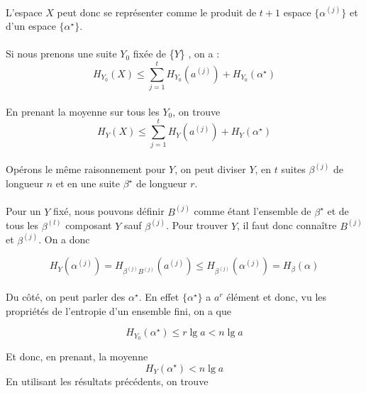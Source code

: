 	\paragraph{}
	L'espace ${X}$ peut donc se représenter comme le produit de $t+1$ 
	espace $\{\alpha^{(j)}\}$ et d'un espace 
	$\{\alpha^\star\}$.
	
	\paragraph{}
	Si nous prenons une suite $Y_0$ fixée de  \{$Y$\} , on a :
	\[
		H_{Y_0}(X)\le 
		\sum_{j=1}^tH_{Y_0}\left(a^{(j)}\right)+H_{Y_0}(\alpha^\star)
	\]
	
	\paragraph{}
	En prenant la moyenne sur tous les $Y_0$, on trouve
	\[H_Y(X)\le \sum_{j=1}^tH_Y\left(a^{(j)}\right)+H_Y(\alpha^\star)\]
	
	\paragraph{}
	Opérons le même raisonnement pour $Y$, on peut diviser $Y$, en $t$ 
	suites $\beta^{(j)}$ de longueur $n$ et en une suite ${\beta^\star}$
	de longueur $r$. 
	
	\paragraph{}
	Pour un $Y$ fixé, nous pouvons définir $B^{(j)}$ comme étant l'ensemble de
	$\beta^\star$ et de tous les $\beta^{(l)}$ composant $Y$ sauf 
	$\beta^{(j)}$. Pour trouver $Y$, il faut donc connaître $B^{(j)}$ 
	et $\beta^{(j)}$. On a 	donc
	
	\[
		H_Y(\alpha^{(j)}) = H_{\beta^{(j)}B^{(j)}}\left(a^{(j)}\right) \le 
		H_{\beta^{(j)}}\left(\alpha^{(j)}\right)=H_\beta(\alpha)
	\]
	
	\paragraph{}
	Du côté, on peut parler des $\alpha^\star$. En effet $\{\alpha^\star\}$ a 
	$a^r$ élément et donc, vu les propriétés de l'entropie d'un ensemble fini,
	on a que
	
	\[H_{Y_0}(\alpha^\star) \le r\lg a < n\lg a\]
	
	Et donc, en prenant, la moyenne 
	\[H_Y(\alpha^\star) < n \lg a\]
	En utilisant les résultats précédents, on trouve
	
